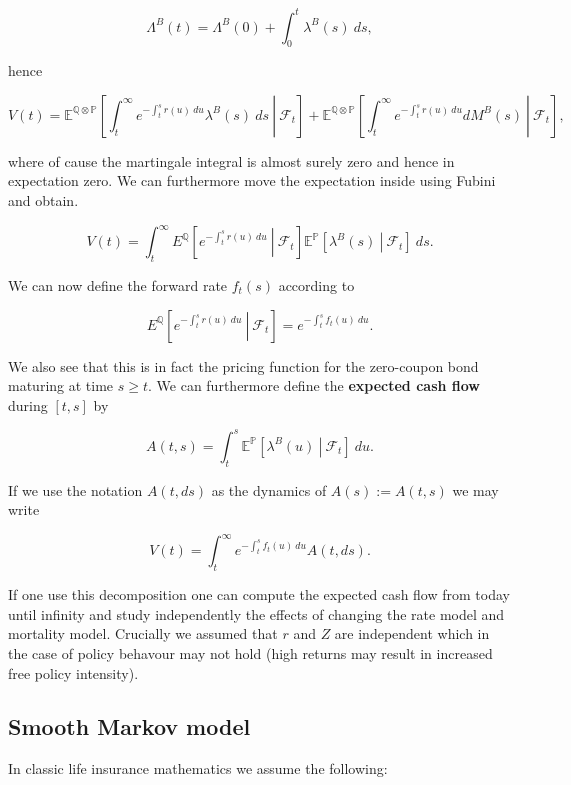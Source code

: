 \documentclass[a4paper,10pt,openany]{book}
\begin{document}
\[
\Lambda^B(t)=\Lambda^B(0)+\int_0^t\lambda^B(s)\ ds,
\]

hence

\[
V(t)=\mathbb E^{\mathbb Q\otimes \mathbb P}\left[\left.\int_t^\infty e^{-\int_t^sr(u)\ du}\lambda^B(s)\ ds\ \right\vert\ \mathcal F_t\right]+\mathbb E^{\mathbb Q\otimes \mathbb P}\left[\left.\int_t^\infty e^{-\int_t^sr(u)\ du}d M^B(s)\ \right\vert\ \mathcal F_t\right],
\]

where of cause the martingale integral is almost surely zero and hence in expectation zero. We can furthermore move the expectation inside using Fubini and obtain.

\[
V(t)=\int_t^\infty E^{\mathbb Q}\left[\left. e^{-\int_t^sr(u)\ du}\ \right\vert\ \mathcal F_t\right]\mathbb E^{\mathbb P}\left[\left.\lambda^B(s)\ \right\vert\ \mathcal F_t\right]\ ds.
\]

We can now define the forward rate \(f_t(s)\) according to

\[
E^{\mathbb Q}\left[\left. e^{-\int_t^sr(u)\ du}\ \right\vert\ \mathcal F_t\right]=e^{-\int_t^sf_t(u)\ du}.
\]

We also see that this is in fact the pricing function for the zero-coupon bond maturing at time \(s\ge t\). We can furthermore define the \textbf{expected cash flow} during \([t,s]\) by

\[
A(t,s)=\int_t^s\mathbb E^{\mathbb P}\left[\left.\lambda^B(u)\ \right\vert\ \mathcal F_t\right]\ du.
\]

If we use the notation \(A(t,ds)\) as the dynamics of \(A(s):=A(t,s)\) we may write

\[
V(t)=\int_t^\infty e^{-\int_t^s f_t(u)\ du} A(t,ds).
\]

If one use this decomposition one can compute the expected cash flow from today until infinity and study independently the effects of changing the rate model and mortality model. Crucially we assumed that \(r\) and \(Z\) are independent which in the case of policy behavour may not hold (high returns may result in increased free policy intensity).

\hypertarget{smooth-markov-model}{%
\subsection{Smooth Markov model}\label{smooth-markov-model}}

In classic life insurance mathematics we assume the following:
\end{document}
